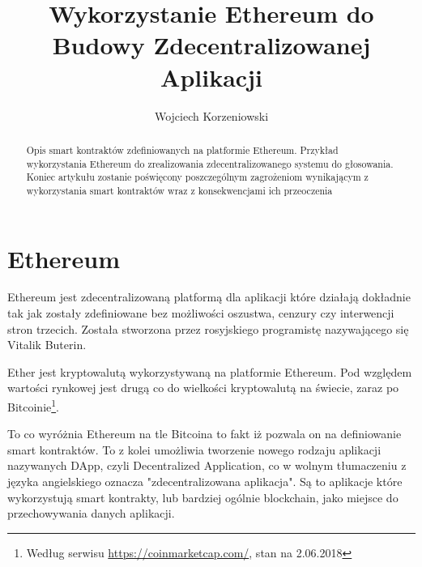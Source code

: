 \documentclass[]{llncs}
\begin{document}
\title{Wykorzystanie Ethereum do Budowy Zdecentralizowanej Aplikacji}
\author{Wojciech Korzeniowski}

\maketitle

\begin{abstract}

  Opis smart kontraktów zdefiniowanych na platformie Ethereum. Przykład
  wykorzystania Ethereum do zrealizowania zdecentralizowanego systemu do
  głosowania. Koniec artykułu zostanie poświęcony poszczególnym zagrożeniom
  wynikającym z wykorzystania smart kontraktów wraz z konsekwencjami ich
  przeoczenia


\end{abstract}

\section{Ethereum}

  Ethereum jest zdecentralizowaną platformą dla aplikacji które działają
  dokładnie tak jak zostały zdefiniowane bez możliwości oszustwa, cenzury czy
  interwencji stron trzecich\cite{ethereum}. Została stworzona przez rosyjskiego
  programistę nazywającego się Vitalik Buterin.

  Ether jest kryptowalutą wykorzystywaną na platformie Ethereum. Pod względem
  wartości rynkowej jest drugą co do wielkości kryptowalutą na świecie, zaraz po
  Bitcoinie\footnote{Według serwisu \url{https://coinmarketcap.com/}, stan na
  2.06.2018}.

  To co wyróżnia Ethereum na tle Bitcoina to fakt iż pozwala on na definiowanie
  smart kontraktów. To z kolei umożliwia tworzenie nowego rodzaju aplikacji
  nazywanych DApp, czyli Decentralized Application, co w wolnym tłumaczeniu z
  języka angielskiego oznacza "zdecentralizowana aplikacja". Są to aplikacje
  które wykorzystują smart kontrakty, lub bardziej ogólnie blockchain, jako
  miejsce do przechowywania danych aplikacji.
\end{document}
